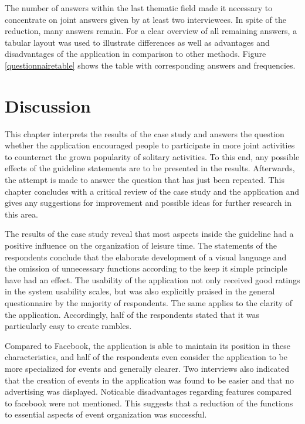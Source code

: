 \documentclass[12pt,numbers=noenddot,parskip,bibliography=totocnumbered,listof=totocnumbered,draft]{scrreprt}
\begin{document}
The number of answers within the last thematic field made it necessary to concentrate on joint answers given by at least two interviewees. In spite of the reduction, many answers remain. For a clear overview of all remaining answers, a tabular layout was used to illustrate differences as well as advantages and disadvantages of the application in comparison to other methods. Figure \ref{questionnairetable} shows the table with corresponding answers and frequencies.

\chapter{Discussion}
This chapter interprets the results of the case study and answers the question whether the application encouraged people to participate in more joint activities to counteract the grown popularity of solitary activities. To this end, any possible effects of the guideline statements are to be presented in the results. Afterwards, the attempt is made to answer the question that has just been repeated. This chapter concludes with a critical review of the case study and the application and gives any suggestions for improvement and possible ideas for further research in this area.

The results of the case study reveal that most aspects inside the guideline had a positive influence on the organization of leisure time. The statements of the respondents conclude that the elaborate development of a visual language and the omission of unnecessary functions according to the keep it simple principle have had an effect. The usability of the application not only received good ratings in the system usability scales, but was also explicitly praised in the general questionnaire by the majority of respondents. The same applies to the clarity of the application. Accordingly, half of the respondents stated that it was particularly easy to create rambles.

Compared to Facebook, the application is able to maintain its position in these characteristics, and half of the respondents even consider the application to be more specialized for events and generally clearer. Two interviews also indicated that the creation of events in the application was found to be easier and that no advertising was displayed. Noticable disadvantages regarding features compared to facebook were not mentioned. This suggests that a reduction of the functions to essential aspects of event organization was successful.
\end{document}
